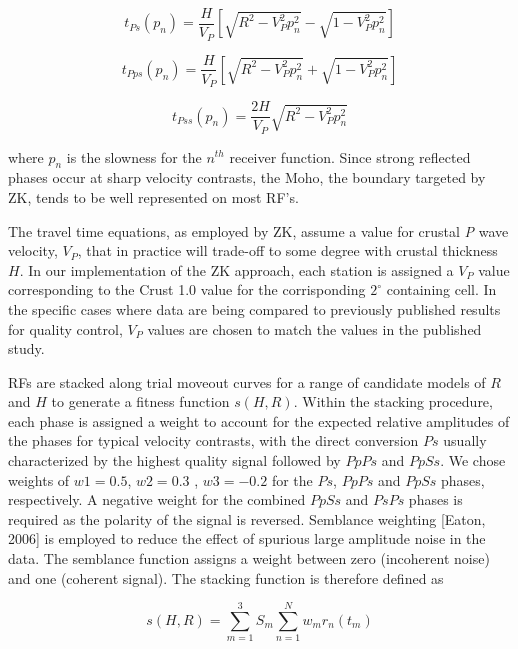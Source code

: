 \documentclass[draft, 12pt]{article}
\begin{document}
\begin{equation} \label{eq:tps}
t_{Ps}(p_n) = \frac{H}{V_P} \left[ \sqrt{ R^2 - V_P^2p_n^2} - \sqrt{1 - V_P^2p_n^2} \right]
\end{equation}

\begin{equation}
t_{Pps}(p_n) = \frac{H}{V_P} \left[ \sqrt{ R^2 - V_P^2p_n^2} + \sqrt{1 - V_P^2p_n^2} \right]
\end{equation}

\begin{equation}
t_{Pss}(p_n)= \frac{2H}{V_P} \sqrt{ R^2 - V_P^2p_n^2}
\end{equation}

\noindent where $p_n$ is the slowness for the $n^{th}$ receiver function. Since strong reflected phases occur at sharp velocity contrasts, the Moho, the boundary targeted by ZK, tends to be well represented on most RF's.

The travel time equations, as employed by ZK, assume a value for crustal {\it P} wave velocity, $V_P$, that in practice will trade-off to some degree with crustal thickness $H$. In our implementation of the ZK approach, each station is assigned a $V_P$ value corresponding to the Crust 1.0 value for the corrisponding $2^\circ$ containing cell. In the specific cases where data are being compared to previously published results for quality control, $V_P$  values are chosen to match the values in the published study.

RFs are stacked along trial moveout curves for a range of candidate models of $R$ and $H$ to generate a fitness function $s(H,R)$.  Within the stacking procedure, each phase is assigned a weight to account for the expected relative amplitudes of the phases for typical velocity contrasts, with the direct conversion $Ps$ usually characterized by the highest quality signal followed by $PpPs$ and $PpSs$. We chose weights of $w1 = 0.5$, $w2 = 0.3$ , $w3 = -0.2$ for the $Ps$, $PpPs$ and $PpSs$ phases, respectively. A negative weight for the combined $PpSs$ and $PsPs$ phases is required as the polarity of the signal is reversed. Semblance weighting [Eaton, 2006] is employed to reduce the effect of spurious large amplitude noise in the data. The semblance function assigns a weight between zero (incoherent noise) and one (coherent signal). The stacking function is therefore defined as

\begin{equation}  \label{eq:stack}
s(H,R) = \sum_{m=1}^{3} S_m \sum_{n=1}^N w_mr_n(t_m)
\end{equation}
\end{document}
